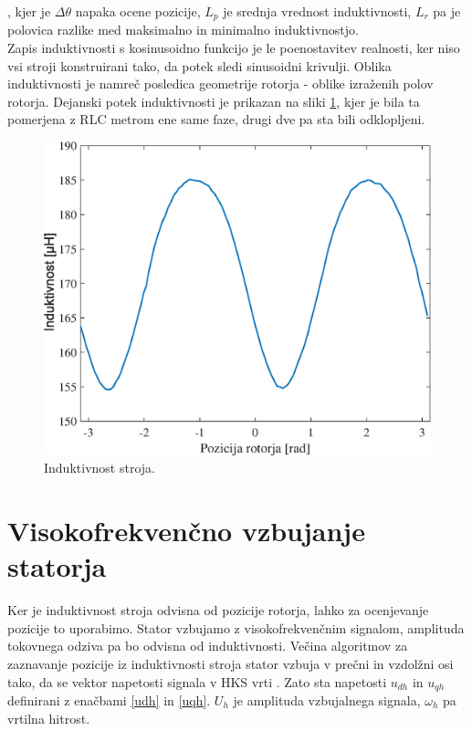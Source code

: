 \documentclass[a4paper,twoside,openright,12pt,slovene]{book}
\begin{document}
, kjer je $\Delta\theta$ napaka ocene pozicije, $L_p$ je srednja vrednost induktivnosti, $L_r$ pa je polovica razlike med maksimalno in minimalno induktivnostjo.
\\
Zapis induktivnosti s kosinusoidno funkcijo je le poenostavitev realnosti, ker niso vsi stroji konstruirani tako, da potek sledi sinusoidni krivulji. Oblika induktivnosti je namreč posledica
geometrije rotorja - oblike izraženih polov rotorja. Dejanski potek induktivnosti je prikazan na sliki \ref{induktivnostStroja}, kjer je bila ta pomerjena z RLC metrom ene same faze, drugi dve pa sta
bili odklopljeni. 

\begin{figure}[!htbp]
    \centering
    \includegraphics[width=0.72\columnwidth]{Slike/induktivnostStroja.eps}
    \caption{\label{induktivnostStroja} Induktivnost stroja. }
\end{figure}

\section{Visokofrekvenčno vzbujanje statorja}

Ker je induktivnost stroja odvisna od pozicije rotorja, lahko za ocenjevanje pozicije to uporabimo. Stator vzbujamo z visokofrekvenčnim signalom, amplituda tokovnega odziva pa bo odvisna od
induktivnosti. Večina algoritmov za zaznavanje pozicije iz induktivnosti stroja stator vzbuja v prečni in vzdolžni osi tako, da se vektor napetosti signala v HKS vrti \cite{ThreeYearsOfExperience}.
Zato sta napetosti $u_{dh}$ in $u_{qh}$ definirani z enačbami \ref{udh} in \ref{uqh}. $U_h$ je amplituda vzbujalnega signala, $\omega_h$ pa vrtilna hitrost.
\end{document}
